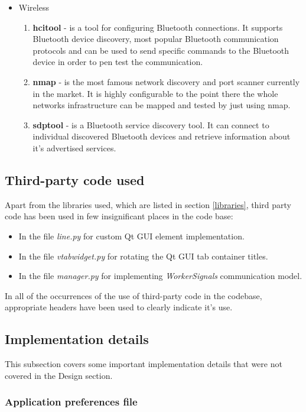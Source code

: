 \begin{itemize}
		\item Wireless
		\begin{enumerate}[resume]
			\item \textbf{hcitool} - is a tool for configuring Bluetooth connections. It supports Bluetooth device discovery, most popular Bluetooth communication protocols and can be used to send specific commands to the Bluetooth device in order to pen test the communication.
			\item \textbf{nmap} - is the most famous network discovery and port scanner currently in the market. It is highly configurable to the point there the whole networks infrastructure can be mapped and tested by just using nmap.
			\item \textbf{sdptool} - is a Bluetooth service discovery tool. It can connect to individual discovered Bluetooth devices and retrieve information about it's advertised services.
		\end{enumerate}
	
	\end{itemize}
		

\subsection{Third-party code used}
	Apart from the libraries used, which are listed in section \ref{libraries}, third party code has been used in few insignificant places in the code base:
	\begin{itemize}
		\item In the file \textit{line.py} for custom Qt GUI element implementation.
		\item In the file \textit{vtabwidget.py} for rotating the Qt GUI tab container titles.
		\item In the file \textit{manager.py} for implementing \textit{WorkerSignals} communication model.
	\end{itemize}
	In all of the occurrences of the use of third-party code in the codebase, appropriate headers have been used to clearly indicate it's use.

\subsection{Implementation details}
	This subsection covers some important implementation details that were not covered in the Design section.

	\subsubsection{Application preferences file}
	

